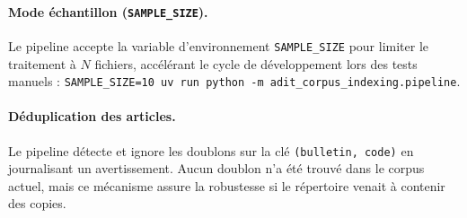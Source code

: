 \paragraph{Mode échantillon (\texttt{SAMPLE\_SIZE}).}
Le pipeline accepte la variable d'environnement \texttt{SAMPLE\_SIZE} pour limiter le
traitement à $N$ fichiers, accélérant le cycle de développement lors des tests manuels :
\texttt{SAMPLE\_SIZE=10 uv run python -m adit\_corpus\_indexing.pipeline}.

\paragraph{Déduplication des articles.}
Le pipeline détecte et ignore les doublons sur la clé \texttt{(bulletin, code)} en
journalisant un avertissement. Aucun doublon n'a été trouvé dans le corpus actuel, mais
ce mécanisme assure la robustesse si le répertoire venait à contenir des copies.
